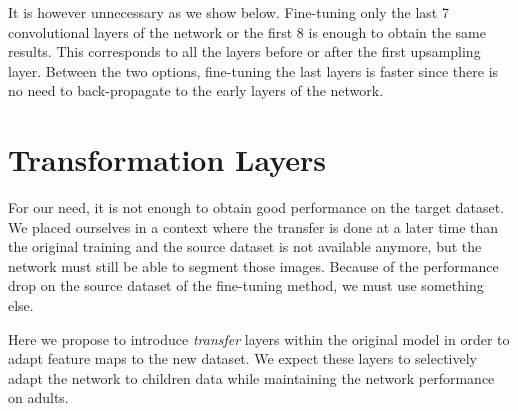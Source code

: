 It is however unnecessary as we show below. Fine-tuning only the last 7 convolutional layers of the network or the first 8 is enough to obtain the same results. This corresponds to all the layers before or after the first upsampling layer. Between the two options, fine-tuning the last layers is faster since there is no need to back-propagate to the early layers of the network.

\section{Transformation Layers}
\label{sec:transfo}

For our need, it is not enough to obtain good performance on the target dataset. We placed ourselves in a context where the transfer is done at a later time than the original training and the source dataset is not available anymore, but the network must still be able to segment those images. Because of the performance drop on the source dataset of the fine-tuning method, we must use something else.

Here we propose to introduce \textit{transfer} layers within the original model in order to adapt feature maps to the new dataset. We expect these layers to selectively adapt the network to children data while maintaining the network performance on adults.



